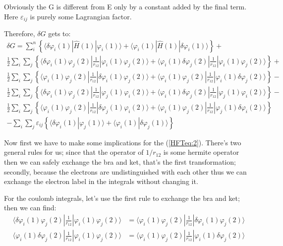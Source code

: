 Obviously the G is different from E only by a constant added by the
final term. Here $\varepsilon_{ij}$ is purely some Lagrangian
factor.

Therefore, $\delta G$ gets to:
\begin{multline}\label{HFTeq:2}
\delta G = \sum_{i}^{n} \left \{
\langle\delta\varphi_{i}(1)|\hat{H}(1)|\varphi_{i}(1)\rangle +
\langle\varphi_{i}(1)|\hat{H}(1)|\delta\varphi_{i}(1)\rangle
\right\} +  \\
\frac{1}{2}\sum_{i}\sum_{j} \left\{
\langle\delta\varphi_{i}(1)\varphi_{j}(2)|\frac{1}{r_{12}}|\varphi_{i}(1)\varphi_{j}(2)\rangle
+
\langle\varphi_{i}(1)\delta\varphi_{j}(2)|\frac{1}{r_{12}}|\varphi_{i}(1)\varphi_{j}(2)\rangle
\right\} +  \\
\frac{1}{2}\sum_{i}\sum_{j} \left\{
\langle\varphi_{i}(1)\varphi_{j}(2)|\frac{1}{r_{12}}|\delta\varphi_{i}(1)\varphi_{j}(2)\rangle
+
\langle\varphi_{i}(1)\varphi_{j}(2)|\frac{1}{r_{12}}|\varphi_{i}(1)\delta\varphi_{j}(2)\rangle
\right\} - \\
\frac{1}{2}\sum_{i}\sum_{j} \left\{
\langle\delta\varphi_{i}(1)\varphi_{j}(2)|\frac{1}{r_{12}}|\varphi_{j}(1)\varphi_{i}(2)\rangle
+
\langle\varphi_{i}(1)\delta\varphi_{j}(2)|\frac{1}{r_{12}}|\varphi_{j}(1)\varphi_{i}(2)\rangle
\right\} - \\
\frac{1}{2}\sum_{i}\sum_{j} \left\{
\langle\varphi_{i}(1)\varphi_{j}(2)|\frac{1}{r_{12}}|\delta\varphi_{j}(1)\varphi_{i}(2)\rangle
+
\langle\varphi_{i}(1)\varphi_{j}(2)|\frac{1}{r_{12}}|\varphi_{j}(1)\delta\varphi_{i}(2)\rangle
\right\} \\
- \sum_{i}\sum_{j} \varepsilon_{ij}\left\{
\langle\delta\varphi_{i}(1)|\varphi_{j}(1)\rangle +
\langle\varphi_{i}(1)|\delta\varphi_{j}(1)\rangle
 \right\}
\end{multline}

Now first we have to make some implications for the (\ref{HFTeq:2}).
There's two general rules for us; since that the operator of
$1/r_{12}$ is some hermite operator then we can safely exchange the
bra and ket, that's the first transformation; secondly, because the
electrons are undistinguished with each other thus we can exchange
the electron label in the integrals without changing it.

For the coulomb integrals, let's use the first rule to exchange the
bra and ket; then we can find:
\begin{align}\label{}
\langle\delta\varphi_{i}(1)\varphi_{j}(2)|\frac{1}{r_{12}}|
\varphi_{i}(1)\varphi_{j}(2)\rangle &=
\langle\varphi_{i}(1)\varphi_{j}(2)|\frac{1}{r_{12}}|
\delta\varphi_{i}(1)\varphi_{j}(2)\rangle \nonumber \\
\langle\varphi_{i}(1)\delta\varphi_{j}(2)|\frac{1}{r_{12}}|
\varphi_{i}(1)\varphi_{j}(2)\rangle &=
\langle\varphi_{i}(1)\varphi_{j}(2)|\frac{1}{r_{12}}|
\varphi_{i}(1)\delta\varphi_{j}(2)\rangle
\end{align}

